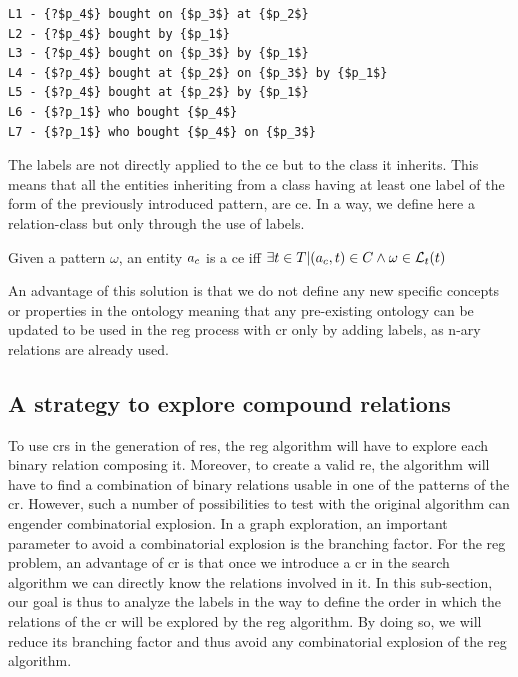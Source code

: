 \begin{lstlisting}[frame=single, caption={ A part of the label set of the purchase compound relation.}, label={lst:chap7_john_labels}, captionpos=b, style=Labels, mathescape=true]
L1 - {?$p_4$} bought on {$p_3$} at {$p_2$}
L2 - {?$p_4$} bought by {$p_1$}
L3 - {?$p_4$} bought on {$p_3$} by {$p_1$}
L4 - {$?p_4$} bought at {$p_2$} on {$p_3$} by {$p_1$}
L5 - {$?p_4$} bought at {$p_2$} by {$p_1$}
L6 - {$?p_1$} who bought {$p_4$}
L7 - {$?p_1$} who bought {$p_4$} on {$p_3$}
\end{lstlisting}

The labels are not directly applied to the \acrshort{ce} but to the class it inherits. This means that all the entities inheriting from a class having at least one label of the form of the previously introduced pattern, are \acrshort{ce}. In a way, we define here a relation-class but only through the use of labels.

\begin{definition} 
\label{the:compound_entity}
Given a pattern $\omega$, an entity $a_c$ is a \acrlong{ce} iff $\exists t \in T | (a_c, t) \in C \land \omega \in \mathcal{L}_t{(t)}$
\end{definition}

An advantage of this solution is that we do not define any new specific concepts or properties in the ontology meaning that any pre-existing ontology can be updated to be used in the \acrshort{reg} process with \acrshort{cr} only by adding labels, as n-ary relations are already used.

\subsection{A strategy to explore compound relations}

To use \acrlong{cr}s in the generation of \acrlong{re}s, the \acrshort{reg} algorithm will have to explore each binary relation composing it. Moreover, to create a valid \acrshort{re}, the algorithm will have to find a combination of binary relations usable in one of the patterns of the \acrshort{cr}. However, such a number of possibilities to test with the original algorithm can engender combinatorial explosion. In a graph exploration, an important parameter to avoid a combinatorial explosion is the branching factor. For the \acrshort{reg} problem, an advantage of \acrshort{cr} is that once we introduce a \acrshort{cr} in the search algorithm we can directly know the relations involved in it. In this sub-section, our goal is thus to analyze the labels in the way to define the order in which the relations of the \acrshort{cr} will be explored by the \acrshort{reg} algorithm. By doing so, we will reduce its branching factor and thus avoid any combinatorial explosion of the \acrshort{reg} algorithm.

